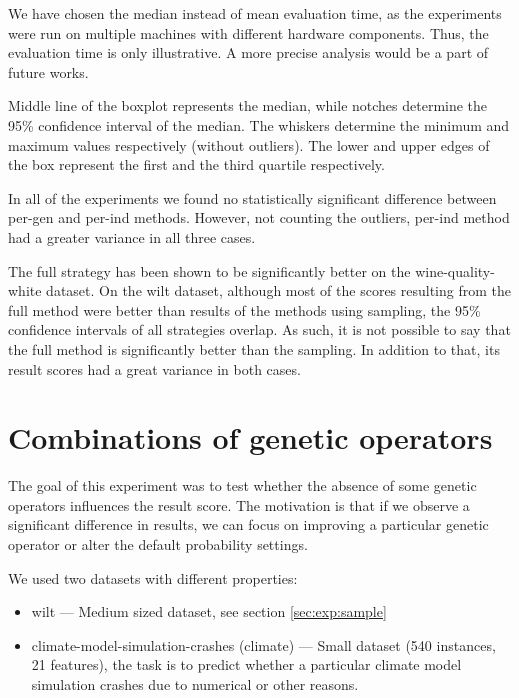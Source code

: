 We have chosen the median instead of mean evaluation time, as the experiments
were run on multiple machines with different hardware components. Thus, the
evaluation time is only illustrative. A more precise analysis would be a part
of future works.

Middle line of the boxplot represents the median, while notches determine the
95\% confidence interval of the median. The whiskers determine the minimum and
maximum values respectively (without outliers). The lower and upper edges of
the box represent the first and the third quartile respectively.

In all of the experiments we found no statistically significant difference
between per-gen and per-ind methods. However, not counting
the outliers, per-ind method had a greater variance in all three cases.

The full strategy has been shown to be significantly better on the
wine-quality-white dataset. On the wilt dataset, although most of the scores
resulting from the full method were better than results of the methods
using sampling, the 95\% confidence intervals of all strategies overlap. As
such, it is not possible to say that the full method is significantly
better than the sampling. In addition to that, its result scores had a great
variance in both cases.







\section{Combinations of genetic operators} \label{sec:exp:genop}
The goal of this experiment was to test whether the absence of some genetic
operators influences the result score. The motivation is that if we observe a
significant difference in results, we can focus on improving a particular
genetic operator or alter the default probability settings.

We used two datasets with different properties:
\begin{itemize}
\item wilt --- Medium sized dataset, see section \ref{sec:exp:sample}
\item climate-model-simulation-crashes (climate) --- Small dataset (540
instances, 21 features), the task is to predict whether a particular
climate model simulation crashes due to numerical or other reasons.
\citep{gmd-6-1157-2013}
\end{itemize}

